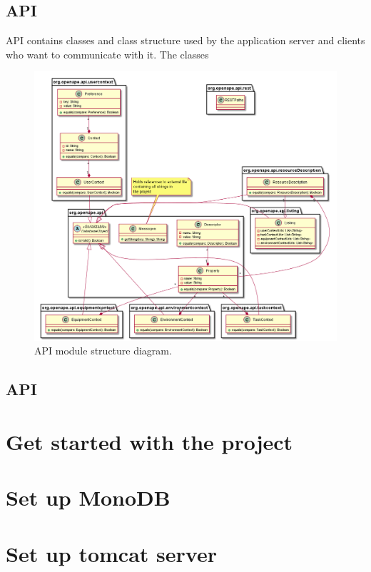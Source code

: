 \documentclass[10pt]{article}
\begin{document}
\subsection{API}
API contains classes and class structure used by the application server and clients who want to communicate with it. The classes 
\begin{figure}[b]
\centering
\includegraphics[width=1\textwidth]{uml/apiuml.png}
\caption{API module structure diagram.}
\end{figure}
\subsection{API}
\section{Get started with the project}
\section{Set up MonoDB}
\section{Set up tomcat server}
\end{document}
